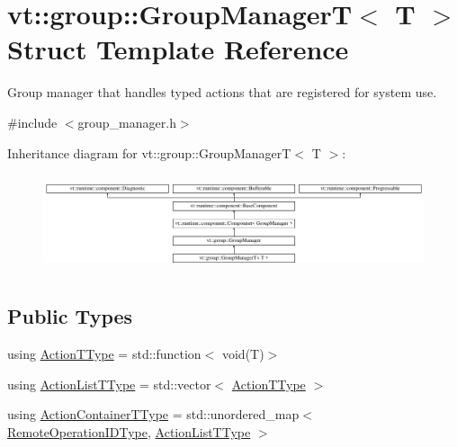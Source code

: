 \hypertarget{structvt_1_1group_1_1_group_manager_t}{}\section{vt\+:\+:group\+:\+:Group\+ManagerT$<$ T $>$ Struct Template Reference}
\label{structvt_1_1group_1_1_group_manager_t}


Group manager that handles typed actions that are registered for system use.  




{\ttfamily \#include $<$group\+\_\+manager.\+h$>$}

Inheritance diagram for vt\+:\+:group\+:\+:Group\+ManagerT$<$ T $>$\+:\begin{figure}[H]
\begin{center}
\leavevmode
\includegraphics[height=2.889577cm]{structvt_1_1group_1_1_group_manager_t}
\end{center}
\end{figure}
\subsection*{Public Types}
\begin{DoxyCompactItemize}
\item 
using \hyperlink{structvt_1_1group_1_1_group_manager_t_acb20922687d3165d97de391fdbaf02ca}{Action\+T\+Type} = std\+::function$<$ void(T)$>$
\item 
using \hyperlink{structvt_1_1group_1_1_group_manager_t_a653158254f8de50d4070f0621644a48a}{Action\+List\+T\+Type} = std\+::vector$<$ \hyperlink{structvt_1_1group_1_1_group_manager_t_acb20922687d3165d97de391fdbaf02ca}{Action\+T\+Type} $>$
\item 
using \hyperlink{structvt_1_1group_1_1_group_manager_t_adc0d6d680c4f8bdbb80cd90f84a5f7ee}{Action\+Container\+T\+Type} = std\+::unordered\+\_\+map$<$ \hyperlink{namespacevt_1_1group_a73f2624ddeb535b39a08b6524f26b244}{Remote\+Operation\+I\+D\+Type}, \hyperlink{structvt_1_1group_1_1_group_manager_t_a653158254f8de50d4070f0621644a48a}{Action\+List\+T\+Type} $>$
\end{DoxyCompactItemize}
